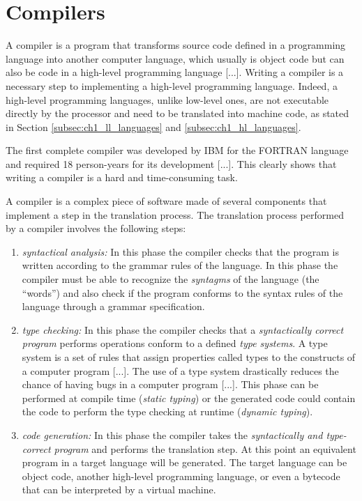 \section{Compilers}
\label{sec:ch1_compilers}
A compiler is a program that transforms source code defined in a programming language into another computer language, which usually is object code but can also be code in a high-level programming language [...]. Writing a compiler is a necessary step to implementing a high-level programming language. Indeed, a high-level programming languages, unlike low-level ones, are not executable directly by the processor and need to be translated into machine code, as stated in Section \ref{subsec:ch1_ll_languages} and \ref{subsec:ch1_hl_languages}.

The first complete compiler was developed by IBM for the FORTRAN language and required 18 person-years for its development [...]. This clearly shows that writing a compiler is a hard and time-consuming task.

A compiler is a complex piece of software made of several components that implement a step in the translation process. The translation process performed by a compiler involves the following steps:

\begin{enumerate}
	\item \textit{syntactical analysis:} In this phase the compiler checks that the program is written according to the grammar rules of the language. In this phase the compiler must be able to recognize the \textit{syntagms} of the language (the ``words'') and also check if the program conforms to the syntax rules of the language through a grammar specification.
	\item \textit{type checking:} In this phase the compiler checks that a \textit{syntactically correct program} performs operations conform to a defined \textit{type systems}. A type system is a set of rules that assign properties called types to the constructs of a computer program [...]. The use of a type system drastically reduces the chance of having bugs in a computer program [...]. This phase can be performed at compile time (\textit{static typing}) or the generated code could contain the code to perform the type checking at runtime (\textit{dynamic typing}). 
	\item \textit{code generation:} In this phase the compiler takes the \textit{syntactically and type-correct program} and performs the translation step. At this point an equivalent program in a target language will be generated. The target language can be object code, another high-level programming language, or even a bytecode that can be interpreted by a virtual machine.
\end{enumerate}

